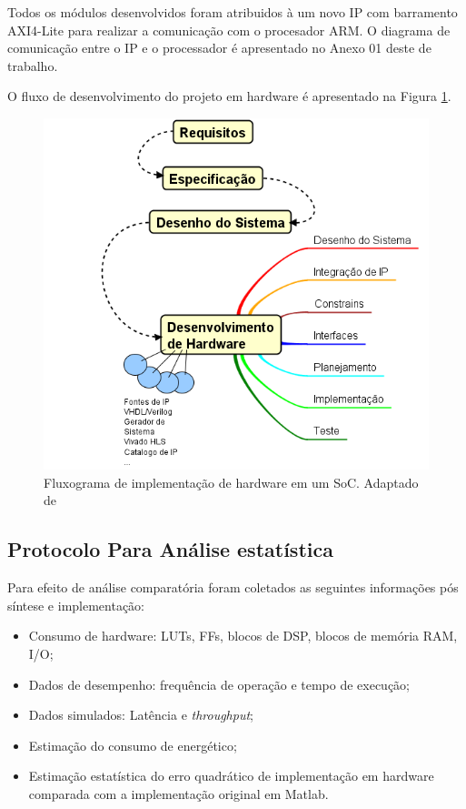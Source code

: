 Todos os módulos desenvolvidos foram atribuidos à um novo IP com barramento AXI4-Lite para realizar a comunicação com o procesador ARM. O diagrama de comunicação entre o IP e o processador é apresentado no Anexo 01 deste de trabalho.

O fluxo de desenvolvimento do projeto em hardware é apresentado na Figura \ref{diagram_hardware}.

\begin{figure}[h]
  \centering
  \includegraphics[keepaspectratio=true,scale=1.0]{figuras/fluxograma_hardware.PNG}
  \caption{Fluxograma de implementação de hardware em um SoC. Adaptado de \cite{zynqBook}}
  \label{diagram_hardware}
\end{figure}

\subsection{Protocolo Para Análise estatística}
Para efeito de análise comparatória foram coletados as seguintes informações pós síntese e implementação:

\begin{itemize}[noitemsep]
	\item Consumo de hardware: LUTs, FFs, blocos de DSP, blocos de memória RAM, I/O;
	\item Dados de desempenho: frequência de operação e tempo de execução;
	\item Dados simulados: Latência e \textit{throughput};
	\item Estimação do consumo de energético;
	\item Estimação estatística do erro quadrático de implementação em hardware comparada com a implementação original em Matlab.
\end{itemize}

